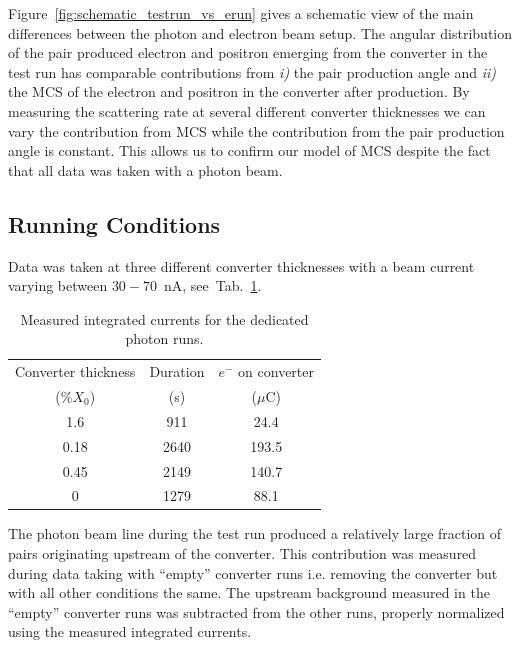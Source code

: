 \documentclass[final,3p,times,twocolumn]{elsarticle}
\begin{document}
Figure~\ref{fig:schematic_testrun_vs_erun} gives a schematic view of the main differences 
between the photon and electron beam setup. 
The angular distribution of the pair produced electron and positron emerging 
from the converter in the test run has comparable contributions from {\it i)} the pair production angle
and {\it ii)} the MCS of the electron and positron in the converter after production. By measuring the 
scattering rate at several different converter thicknesses we can vary the contribution from MCS 
while the contribution from the pair production angle is constant. This allows us to confirm our model of MCS 
despite the fact that all data was taken with a photon beam.


\subsection{Running Conditions}

Data was taken at three different converter thicknesses with a beam current varying between 
$30-70$~nA, see~Tab.~\ref{tab:currents}.  
\begin{table}[t]
\begin{center}
{\small
\begin{tabular}{|c|c|c|}
\hline
Converter thickness & Duration &  $e^-$ on converter \\
 (\%$X_0$) & (s) & ($\mu$C)    \\   
\hline
1.6   & 911 &   24.4 \\ %
0.18   & 2640 &   193.5 \\ %
0.45  & 2149 &     140.7 \\ %
0    & 1279  &   88.1 \\ %
\hline
\end{tabular}
}
\caption{Measured integrated currents for the dedicated photon runs.}
\label{tab:currents}
\end{center}
\end{table}
The photon beam line during the test run produced a relatively 
large fraction of pairs 
originating upstream of the converter. This contribution was measured during data taking 
with ``empty'' converter runs i.e. removing the converter but with all other conditions 
the same. 
The upstream background measured in the ``empty'' converter runs was subtracted 
from the other runs, properly normalized using the measured integrated currents.
\end{document}
